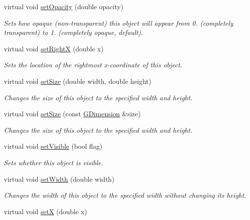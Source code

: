 \begin{DoxyCompactItemize}
virtual void \mbox{\hyperlink{classGObject_a04af1866cc1bae4a1226695794a50539}{set\+Opacity}} (double opacity)
\begin{DoxyCompactList}\small\item\em Sets how opaque (non-\/transparent) this object will appear from 0. (completely transparent) to 1. (completely opaque, default). \end{DoxyCompactList}\item 
virtual void \mbox{\hyperlink{classGObject_a3c90b758cdc2c911c9ef76c4360eb912}{set\+RightX}} (double x)
\begin{DoxyCompactList}\small\item\em Sets the location of the rightmost x-\/coordinate of this object. \end{DoxyCompactList}\item 
virtual void \mbox{\hyperlink{classGObject_aca25d49481f9bf5fc8f7df4c086c4ce7}{set\+Size}} (double width, double height)
\begin{DoxyCompactList}\small\item\em Changes the size of this object to the specified width and height. \end{DoxyCompactList}\item 
virtual void \mbox{\hyperlink{classGObject_ae2b628228f192c2702c4ce941b2af68f}{set\+Size}} (const \mbox{\hyperlink{classGDimension}{G\+Dimension}} \&size)
\begin{DoxyCompactList}\small\item\em Changes the size of this object to the specified width and height. \end{DoxyCompactList}\item 
virtual void \mbox{\hyperlink{classGObject_a88203f28224315d9f4471212f4af8ed3}{set\+Visible}} (bool flag)
\begin{DoxyCompactList}\small\item\em Sets whether this object is visible. \end{DoxyCompactList}\item 
virtual void \mbox{\hyperlink{classGObject_aa3f3fba4cb131baa8696ba01e3bceca1}{set\+Width}} (double width)
\begin{DoxyCompactList}\small\item\em Changes the width of this object to the specified width without changing its height. \end{DoxyCompactList}\item 
virtual void \mbox{\hyperlink{classGObject_a9c18fcc579333bf9653d13ad2b372e39}{setX}} (double x)

\end{DoxyCompactItemize}
